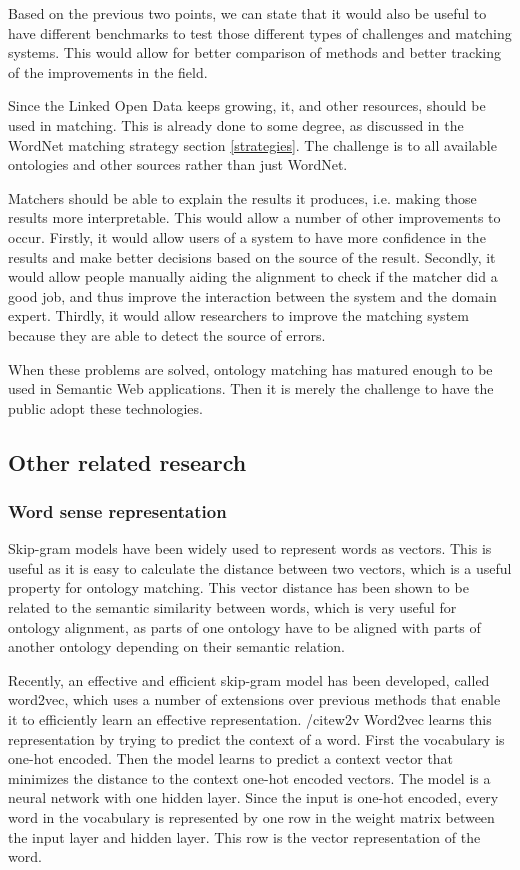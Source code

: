 \documentclass{article}
\begin{document}
 Based on the previous two points, we can state that it would also be useful to have different benchmarks to test those different types of challenges and matching systems. This would allow for better comparison of methods and better tracking of the improvements in the field.
 
 Since the Linked Open Data keeps growing, it, and other resources, should be used in matching. This is already done to some degree, as discussed in the WordNet matching strategy section \ref{strategies}. The challenge is to all available ontologies and other sources rather than just WordNet.
 
 Matchers should be able to explain the results it produces, i.e. making those results more interpretable. This would allow a number of other improvements to occur. Firstly, it would allow users of a system to have more confidence in the results and make better decisions based on the source of the result. Secondly, it would allow people manually aiding the alignment to check if the matcher did a good job, and thus improve the interaction between the system and the domain expert. Thirdly, it would allow researchers to improve the matching system because they are able to detect the source of errors.
 
 When these problems are solved, ontology matching has matured enough to be used in Semantic Web applications. Then it is merely the challenge to have the public adopt these technologies.
 
 \subsection{Other related research}
 \subsubsection{Word sense representation} \label{w2v}
 Skip-gram models have been widely used to represent words as vectors. This is useful as it is easy to calculate the distance between two vectors, which is a useful property for ontology matching. This vector distance has been shown to be related to the semantic similarity between words, which is very useful for ontology alignment, as parts of one ontology have to be aligned with parts of another ontology depending on their semantic relation.
 
 Recently, an effective and efficient skip-gram model has been developed, called word2vec, which uses a number of extensions over previous methods that enable it to efficiently learn an effective representation. /cite{w2v}
 Word2vec learns this representation by trying to predict the context of a word. First the vocabulary is one-hot encoded. Then the model learns to predict a context vector that minimizes the distance to the context one-hot encoded vectors. The model is a neural network with one hidden layer. Since the input is one-hot encoded, every word in the vocabulary is represented by one row in the weight matrix between the input layer and hidden layer. This row is the vector representation of the word.
 
\end{document}

